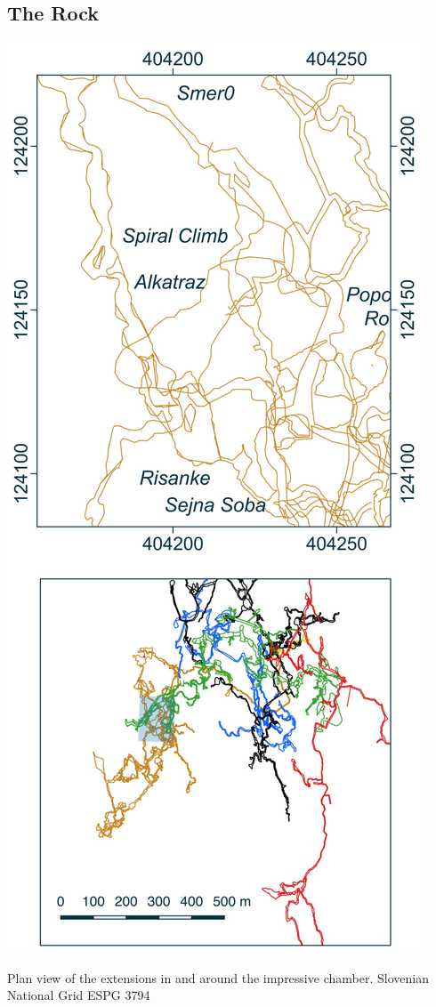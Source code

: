 \subsection{The Rock}
\begin{marginfigure}
\checkoddpage \ifoddpage \forcerectofloat \else \forceversofloat \fi
\centering
 \includegraphics[width=\linewidth]{images/little_insets/alk_inset.pdf}
 \caption{Plan view of the extensions in and around the impressive \protect{} chamber. Slovenian National Grid ESPG 3794}
 \label{Alkatraz inset}
\end{marginfigure}



